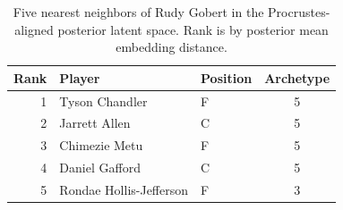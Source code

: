 \begin{table}[htbp]
  \centering\small
  \begin{tabular}{rllc}
    \toprule
    Rank & Player & Position & Archetype \\
    \midrule
    1 & Tyson Chandler & F & 5 \\
    2 & Jarrett Allen & C & 5 \\
    3 & Chimezie Metu & F & 5 \\
    4 & Daniel Gafford & C & 5 \\
    5 & Rondae Hollis-Jefferson & F & 3 \\
    \bottomrule
  \end{tabular}
  \caption{Five nearest neighbors of Rudy Gobert in the Procrustes-aligned posterior latent space. Rank is by posterior mean embedding distance.}
  \label{tab:Rudy_Gobert_neighbors}
\end{table}

